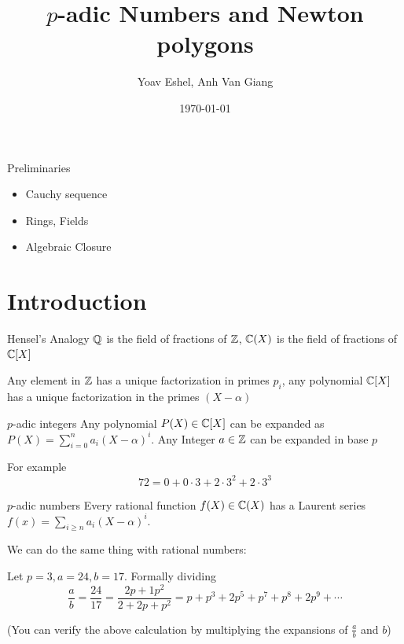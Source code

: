 \documentclass{beamer}
\title{$p$-adic Numbers and Newton polygons}
\date{\today}
\author{Yoav Eshel, Anh Van Giang}
\institute{Vrije Universiteit Amsterdam}
\begin{document}
    \maketitle
    \begin{frame}{Preliminaries}
        \begin{itemize}
            \item Cauchy sequence
            \item Rings, Fields
            \item Algebraic Closure
        \end{itemize}
    \end{frame}
    \section{Introduction}
    \begin{frame}{Hensel's Analogy}
        $\mathbb{Q}$ is the field of fractions of $\mathbb{Z}$, $\mathbb{C}(X)$ is the field of fractions of $\mathbb{C}[X]$\pause
        
        Any element in $\mathbb{Z}$ has a unique factorization in primes $p_i$, any polynomial $\mathbb{C}[X]$ has a unique factorization in the primes $(X-\alpha)$
    \end{frame}
    \begin{frame}{$p$-adic integers}
        Any polynomial $P(X)\in\mathbb{C}[X]$ can be expanded as $P(X)=\sum_{i=0}^n a_i(X-\alpha)^i$.
        Any Integer $a\in\mathbb{Z}$ can be expanded in base $p$\pause
        
        For example
        $$72=0+0\cdot 3+2\cdot3^2+2\cdot 3^3$$
    \end{frame}
    \begin{frame}{$p$-adic numbers}
        Every rational function $f(X)\in\mathbb{C}(X)$ has a Laurent series $f(x)=\sum_{i\geq n} a_i(X-\alpha)^i$.
        
        We can do the same thing with rational numbers: 
        
        Let $p=3, a=24, b=17$. Formally dividing
        $$\frac{a}{b}=\frac{24}{17}=\frac{2p+1p^2}{2+2p+p^2}=p+p^3+2p^5+p^7+p^8+2p^9+\cdots$$\pause
        
        (You can verify the above calculation by multiplying the expansions of $\frac{a}{b}$ and $b$)
    \end{frame}
        
\end{document}
